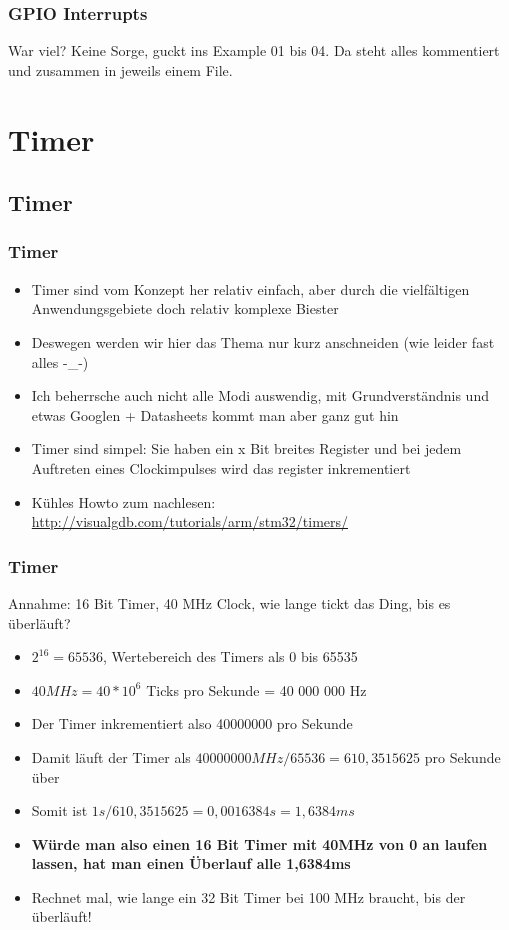 \documentclass[ngerman,compress]{beamer}
\begin{document}
\begin{frame} [fragile]
	\frametitle{GPIO Interrupts}
	War viel? Keine Sorge, guckt ins Example 01 bis 04. Da steht alles kommentiert und zusammen in jeweils einem File.
\end{frame}


\section{Timer}

\subsection{Timer}

\begin{frame}
	\frametitle{Timer}
	\begin{itemize}
		\item Timer sind vom Konzept her relativ einfach, aber durch die vielfältigen Anwendungsgebiete doch relativ komplexe Biester
		\item Deswegen werden wir hier das Thema nur kurz anschneiden (wie leider fast alles -\_-)
		\item Ich beherrsche auch nicht alle Modi auswendig, mit Grundverständnis und etwas Googlen + Datasheets kommt man aber ganz gut hin
		\item Timer sind simpel: Sie haben ein x Bit breites Register und bei jedem Auftreten eines Clockimpulses wird das register inkrementiert
		\item Kühles Howto zum nachlesen: \url{http://visualgdb.com/tutorials/arm/stm32/timers/}
	\end{itemize}
\end{frame}

\begin{frame}
	\frametitle{Timer}
	Annahme: 16 Bit Timer, 40 MHz Clock, wie lange tickt das Ding, bis es überläuft?
	\begin{itemize}
		\item $2^{16} = 65536$, Wertebereich des Timers als 0 bis 65535
		\item $40MHz = 40*{10}^{6}$ Ticks pro Sekunde = 40 000 000 Hz
		\item Der Timer inkrementiert also 40000000 pro Sekunde
		\item Damit läuft der Timer als $40000000MHz/65536 = 610,3515625$ pro Sekunde über
		\item Somit ist $1s/610,3515625 = 0,0016384s = 1,6384ms$
		\pause
		\item \textbf{Würde man also einen 16 Bit Timer mit 40MHz von 0 an laufen lassen, hat man einen Überlauf alle 1,6384ms}
		\pause
		\item Rechnet mal, wie lange ein 32 Bit Timer bei 100 MHz braucht, bis der überläuft!
	\end{itemize}
\end{frame}
\end{document}
